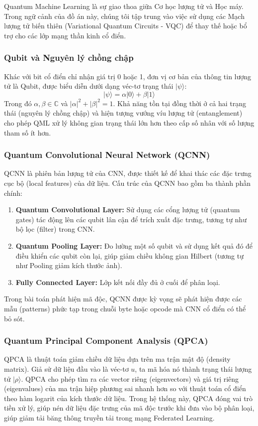 Quantum Machine Learning là sự giao thoa giữa Cơ học lượng tử và Học máy. Trong ngữ cảnh của đồ án này, chúng tôi tập trung vào việc sử dụng các Mạch lượng tử biến thiên (Variational Quantum Circuits - VQC) để thay thế hoặc bổ trợ cho các lớp mạng thần kinh cổ điển.

\subsubsection{Qubit và Nguyên lý chồng chập}
Khác với bit cổ điển chỉ nhận giá trị 0 hoặc 1, đơn vị cơ bản của thông tin lượng tử là Qubit, được biểu diễn dưới dạng véc-tơ trạng thái $|\psi\rangle$:
$$|\psi\rangle = \alpha|0\rangle + \beta|1\rangle$$
Trong đó $\alpha, \beta \in \mathbb{C}$ và $|\alpha|^2 + |\beta|^2 = 1$. Khả năng tồn tại đồng thời ở cả hai trạng thái (nguyên lý chồng chập) và hiện tượng vướng víu lượng tử (entanglement) cho phép QML xử lý không gian trạng thái lớn hơn theo cấp số nhân với số lượng tham số ít hơn.

\subsubsection{Quantum Convolutional Neural Network (QCNN)}
QCNN \cite{Cong_2019} là phiên bản lượng tử của CNN, được thiết kế để khai thác các đặc trưng cục bộ (local features) của dữ liệu. Cấu trúc của QCNN bao gồm ba thành phần chính:
\begin{enumerate}
    \item \textbf{Quantum Convolutional Layer:} Sử dụng các cổng lượng tử (quantum gates) tác động lên các qubit lân cận để trích xuất đặc trưng, tương tự như bộ lọc (filter) trong CNN.
    \item \textbf{Quantum Pooling Layer:} Đo lường một số qubit và sử dụng kết quả đó để điều khiển các qubit còn lại, giúp giảm chiều không gian Hilbert (tương tự như Pooling giảm kích thước ảnh).
    \item \textbf{Fully Connected Layer:} Lớp kết nối đầy đủ ở cuối để phân loại.
\end{enumerate}
Trong bài toán phát hiện mã độc, QCNN được kỳ vọng sẽ phát hiện được các mẫu (patterns) phức tạp trong chuỗi byte hoặc opcode mà CNN cổ điển có thể bỏ sót.

\subsubsection{Quantum Principal Component Analysis (QPCA)}
QPCA \cite{Lloyd_2014} là thuật toán giảm chiều dữ liệu dựa trên ma trận mật độ (density matrix).
Giả sử dữ liệu đầu vào là véc-tơ $u$, ta mã hóa nó thành trạng thái lượng tử $|\rho\rangle$. QPCA cho phép tìm ra các vector riêng (eigenvectors) và giá trị riêng (eigenvalues) của ma trận hiệp phương sai nhanh hơn so với thuật toán cổ điển theo hàm logarit của kích thước dữ liệu.
Trong hệ thống này, QPCA đóng vai trò tiền xử lý, giúp nén dữ liệu đặc trưng của mã độc trước khi đưa vào bộ phân loại, giúp giảm tải băng thông truyền tải trong mạng Federated Learning.

